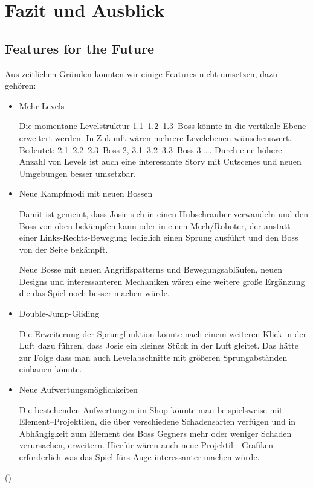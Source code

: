 \chapter{Fazit und Ausblick}

\section{Features for the Future}

Aus zeitlichen Gründen konnten wir einige Features nicht umsetzen, dazu gehören:

\begin{itemize}

\item Mehr Levels

Die momentane Levelstruktur 1.1--1.2--1.3--Boss könnte in die vertikale Ebene erweitert werden. In Zukunft wären mehrere Levelebenen wünschenswert. Bedeutet: 2.1--2.2--2.3--Boss 2,  3.1--3.2--3.3--Boss 3 \dots. Durch eine höhere Anzahl von Levels ist auch eine interessante Story mit Cutscenes und neuen Umgebungen besser umsetzbar. 

\item Neue Kampfmodi mit neuen Bossen

Damit ist gemeint, dass Josie sich in einen Hubschrauber verwandeln und den Boss von oben bekämpfen kann oder in einen Mech/Roboter, der anstatt einer Links-Rechts-Bewegung lediglich einen Sprung ausführt und den Boss von der Seite bekämpft.

Neue Bosse mit neuen Angriffspatterns und Bewegungsabläufen, neuen Designs und interessanteren Mechaniken wären eine weitere große Ergänzung die das Spiel noch besser machen würde.

\item Double-Jump-Gliding

Die Erweiterung der Sprungfunktion könnte nach einem weiteren Klick in der Luft dazu führen, dass Josie ein kleines Stück in der Luft gleitet. Das hätte zur Folge dass man auch Levelabschnitte mit größeren Sprungabständen einbauen könnte.

\item Neue Aufwertungsmöglichkeiten

Die bestehenden Aufwertungen im Shop könnte man beispielsweise mit Element--Projektilen, die über verschiedene Schadensarten verfügen und in Abhängigkeit zum Element des Boss Gegners mehr oder weniger Schaden verursachen, erweitern. Hierfür wären auch neue Projektil- -Grafiken erforderlich was das Spiel fürs Auge interessanter machen würde.



\end{itemize}
()